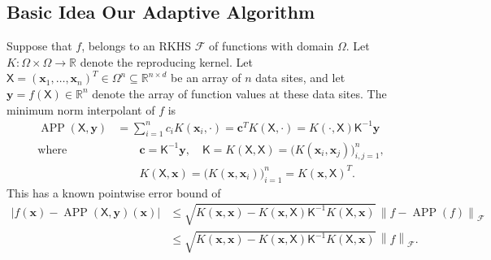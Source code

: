 \documentclass[]{mcom-l}
\theoremstyle{remark}
\DeclareMathOperator{\APP}{APP}
\newcommand{\reals}{{\mathbb{R}}}
\newcommand{\mK}{\mathsf{K}}
\newcommand{\mX}{\mathsf{X}}
\newcommand{\bc}{{\boldsymbol{c}}}
\newcommand{\bx}{{\boldsymbol{x}}}
\newcommand{\by}{{\boldsymbol{y}}}
\newcommand{\cx}{{\Omega}}
\newcommand{\calf}{{\mathcal{F}}}
\def\abs#1{\ensuremath{\left \lvert #1 \right \rvert}}
\newcommand{\norm}[2][{}]{\ensuremath{\left \lVert #2 \right \rVert}_{#1}}
\newcommand{\bignorm}[2][{}]{\ensuremath{\bigl \lVert #2 \bigr \rVert}_{#1}}
\begin{document}
\subsection{Basic Idea Our Adaptive Algorithm} \label{sec:basicIdea}
Suppose that $f$, belongs to an RKHS $\calf$ of functions with domain $\cx$.  Let $K: \Omega \times \Omega \to \reals$ denote the reproducing kernel.  Let $\mX = (\bx_1, \ldots, \bx_n)^T \in \cx^n \subseteq \reals^{n \times d}$ be an array of $n$ data sites, and let $\by  = f(\mX) \in \reals^n$ denote the array of function values at these data sites.  
The minimum norm interpolant of $f$ is 
\begin{subequations} \label{eq:RKHSAPP}
\begin{align} 
\APP(\mX,\by) &= \sum_{i=1}^n c_i K(\bx_i,\cdot) = \bc^T K(\mX,\cdot) =  K(\cdot, \mX) \mK^{-1} \by \, \\
 \text{where } & \qquad \bc = \mK^{-1} \by, \quad \mK = K(\mX,\mX) = \bigl( K(\bx_i,\bx_j) \bigr)_{i,j=1}^n,  \\
& \qquad  K(\mX,\bx) = \bigl(K(\bx,\bx_i) \bigr)_{i=1}^n =  K(\bx, \mX)^T.
\end{align}
\end{subequations}
This has a known pointwise error bound of
\begin{align}
\label{eq:RKHSErrBd}
\abs{f(\bx) - \APP(\mX,\by)(\bx)} & \le \sqrt{K(\bx,\bx) - K(\bx,\mX) \mK^{-1} K(\mX,\bx)} \, \bignorm[\calf]{f - \APP(f)} \\
\nonumber
& \le \sqrt{K(\bx,\bx) - K(\bx,\mX) \mK^{-1} K(\mX,\bx) } \, \norm[\calf]{f} .
\end{align}
\end{document}

